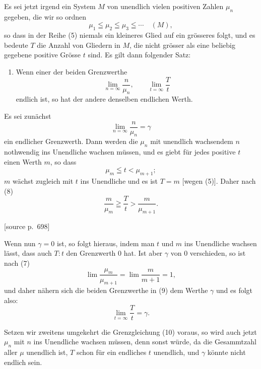 \documentclass[11pt]{article}
\newcommand{\srcpage}[1]{\par\medskip\noindent\textsf{[source p.~#1]}\par\smallskip}
\begin{document}
Es sei jetzt irgend ein System $M$ von unendlich vielen positiven Zahlen $\mu_n$ gegeben, die wir so ordnen
\begin{equation}
\mu_1\leqq\mu_2\leqq\mu_3\leqq\cdots\quad (M),
\tag{5}
\end{equation}
so dass in der Reihe (5) niemals ein kleineres Glied auf ein grösseres folgt, und es bedeute $T$ die Anzahl von Gliedern in $M$, die nicht grösser als eine beliebig gegebene positive Grösse $t$ sind. Es gilt dann folgender Satz:

\begin{enumerate}[label=\textbf{\arabic*.},leftmargin=2.2em,start=4]
\item Wenn einer der beiden Grenzwerthe
\begin{equation}
\lim_{n=\infty}\frac{n}{\mu_n},\qquad \lim_{t=\infty}\frac{T}{t}
\tag{6}
\end{equation}
endlich ist, so hat der andere denselben endlichen Werth.
\end{enumerate}

Es sei zunächst
\begin{equation}
\lim_{n=\infty}\frac{n}{\mu_n}=\gamma
\tag{7}
\end{equation}
ein endlicher Grenzwerth. Dann werden die $\mu_n$ mit unendlich wachsendem $n$ nothwendig ins Unendliche wachsen müssen, und es giebt für jedes positive $t$ einen Werth $m$, so dass
\begin{equation}
\mu_m\leqq t<\mu_{m+1};
\tag{8}
\end{equation}
$m$ wächst zugleich mit $t$ ins Unendliche und es ist $T=m$ [wegen (5)]. Daher nach (8)
\begin{equation}
\frac{m}{\mu_m}\geqq\frac{T}{t}>\frac{m}{\mu_{m+1}} .
\tag{9}
\end{equation}

\srcpage{698}
Wenn nun $\gamma=0$ ist, so folgt hieraus, indem man $t$ und $m$ ins Unendliche wachsen lässt, dass auch $T:t$ den Grenzwerth $0$ hat. Ist aber $\gamma$ von $0$ verschieden, so ist nach (7)
\[
\lim\frac{\mu_m}{\mu_{m+1}}=\lim\frac{m}{m+1}=1,
\]
und daher nähern sich die beiden Grenzwerthe in (9) dem Werthe $\gamma$ und es folgt also:
\begin{equation}
\lim_{t=\infty}\frac{T}{t}=\gamma.
\tag{10}
\end{equation}

Setzen wir zweitens umgekehrt die Grenzgleichung (10) voraus, so wird auch jetzt $\mu_n$ mit $n$ ins Unendliche wachsen müssen, denn sonst würde, da die Gesammtzahl aller $\mu$ unendlich ist, $T$ schon für ein endliches $t$ unendlich, und $\gamma$ könnte nicht endlich sein.
\end{document}
